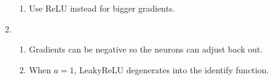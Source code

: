 \documentclass[12pt, a4paper]{article}
\begin{document}
\begin{enumerate}[\Alph*.]
\begin{enumerate}[\arabic*.]
\begin{enumerate}[(\alph*.)]
          \item Use ReLU instead for bigger gradients.
        \end{enumerate}

      \item 
        \begin{enumerate}[(\alph*.)]
          \item Gradients can be negative so the neurons can adjust back out. 

          \item When $a = 1$, LeakyReLU degenerates into the identify function. 
        \end{enumerate}
    \end{enumerate}
\end{enumerate}
\end{document}
